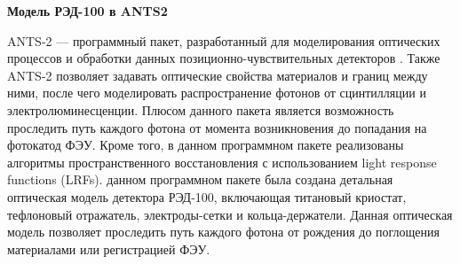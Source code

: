 \par\textbf{Модель РЭД-100 в ANTS2}

ANTS-2 — программный пакет, разработанный для моделирования оптических процессов и обработки данных позиционно-чувствительных детекторов \cite{Morozov_2016}. Также ANTS-2 позволяет задавать оптические свойства материалов и границ между ними, после чего моделировать распространение фотонов от сцинтилляции и электролюминесценции. Плюсом данного пакета является возможность проследить путь каждого фотона от момента возникновения до попадания на фотокатод ФЭУ. 
Кроме того, в данном программном пакете реализованы алгоритмы пространственного восстановления с использованием light response functions (LRFs).
 данном программном пакете была создана детальная оптическая модель детектора РЭД-100, включающая титановый криостат, тефлоновый отражатель, электроды-сетки и кольца-держатели. Данная оптическая модель позволяет проследить путь каждого фотона от рождения до поглощения материалами или регистрацией ФЭУ. 
